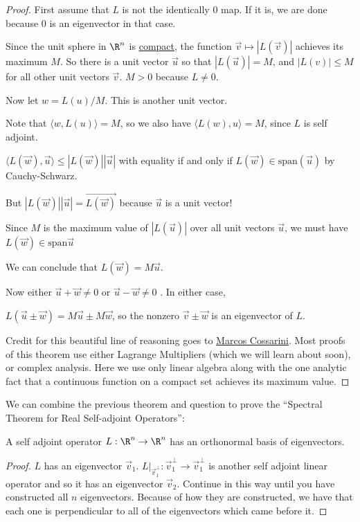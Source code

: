 \documentclass{ximera}
\begin{document}
\begin{proof}
	First assume that $L$ is not the identically $0$ map.  If it is, we are done because $0$ is an eigenvector in that case.
	
	Since the unit sphere in $\R^n$ is \href{http://en.wikipedia.org/wiki/Compact_space}{compact},
	 the function $\vec{v} \mapsto |L(\vec{v})|$ achieves its maximum $M$.  So there is a unit vector 
	$\vec{u}$ so that $|L(\vec{u})| = M$, and $|L(v)| \leq M$ for all other unit vectors $\vec{v}$.  $M > 0$ because $L \neq 0$.
	
	Now let $w = L(u)/M$.  This is another unit vector.
	
	Note that $\langle w, L(u)\rangle = M$, so we also have $\langle L(w), u \rangle = M$, since $L$ is self adjoint.
	
	$\langle L(\vec{w}),\vec{u}\rangle \leq |L(\vec{w})||\vec{u}|$ with equality if and only if $L(\vec{w}) \in \mathrm{span}(\vec{u})$ by Cauchy-Schwarz.
	
	But $|L(\vec{w})||\vec{u}| = \vec{L(\vec{w})}$ because $\vec{u}$ is a unit vector!
		
	Since $M$ is the maximum value of $|L(\vec{u})|$ over all unit vectors $\vec{u}$, we must have  $L(\vec{w}) \in \mathrm{span}{\vec{u}}$
	
	We can conclude that $L(\vec{w}) = M\vec{u}$.
	
	Now either $\vec{u}+\vec{w} \neq 0$ or $\vec{u}-\vec{w} \neq 0$ .  In either case,
	
	$L(\vec{u} \pm \vec{w}) = M\vec{u} \pm M\vec{w}$, so the nonzero $\vec{v} \pm \vec{w}$ is an eigenvector of $L$.
	
	Credit for this beautiful line of reasoning goes to \href{http://mathoverflow.net/a/118759/1106}{Marcos Cossarini}.  Most proofs of this theorem use either 
	Lagrange Multipliers (which we will learn about soon), or complex analysis.  Here we use only linear algebra along with the one analytic fact that a continuous 
	function on a compact set achieves its maximum value.
\end{proof}

	We can combine the previous theorem and question to prove the ``Spectral Theorem for Real Self-adjoint Operators'':  
	
	\begin{theorem}
		A self adjoint operator $L : \R^n \to \R^n$ has an orthonormal basis of eigenvectors.
	\end{theorem}
	
\begin{proof}
	$L$ has an eigenvector $\vec{v}_1$.  $L\big|_{\vec{v}_1^\perp} : \vec{v}_1^\perp \to \vec{v}_1^\perp$  is another self adjoint linear operator and so it has an eigenvector $\vec{v}_2$.  
	Continue in this way until you have constructed all $n$ eigenvectors.  Because of how they are constructed, we have that each one is perpendicular to all of the 
	eigenvectors which came before it. 
\end{proof}
\end{document}
